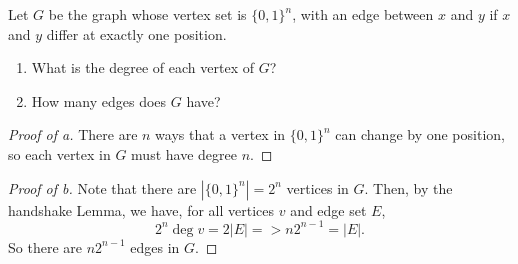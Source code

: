 \documentclass[../hw4]{subfiles}
\begin{document}
\begin{problem}
Let $G$ be the graph whose vertex set is $\{0,1\}^n$, with an edge between $x$ and $y$ if $x$ and $y$ differ at exactly one position.
\begin{enumerate}
	\item What is the degree of each vertex of $G$?
	\item How many edges does $G$ have?
\end{enumerate}
\end{problem}
\begin{proof}[Proof of a]
	There are $n$ ways that a vertex in  $\{0,1\}^n$ can change by one position, so each vertex in $G$ must have degree  $n$.
\end{proof}
\begin{proof}[Proof of b]
	Note that there are $|\{0,1\}^n| = 2^n$ vertices in $G$.
	Then, by the handshake Lemma, we have, for all vertices $v$ and edge set $E$, \[
		2^n \deg{v} = 2|E| => n2^{n-1} = |E|
		.\]
	So there are $n 2^{n-1}$ edges in $G$.
\end{proof}
\end{document}
